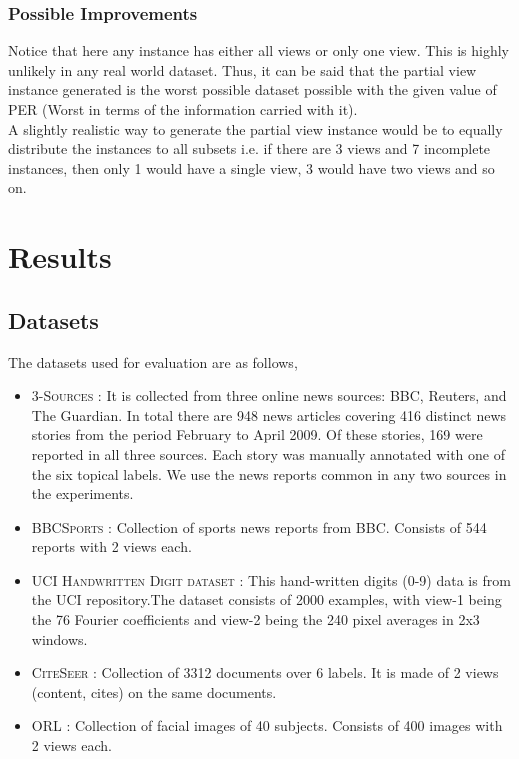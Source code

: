 \documentclass[a4paper]{article}
\begin{document}
	\subsubsection{Possible Improvements}
	
	Notice that here any instance has either all views or only one view. This is highly unlikely in any real world dataset. Thus, it can be said that the partial view instance generated is the worst possible dataset possible with the given value of PER (Worst in terms of the information carried with it).\\
	A slightly realistic way to generate the partial view instance would be to equally distribute the instances to all subsets i.e. if there are 3 views and 7 incomplete instances, then only 1 would have a single view, 3 would have two views and so on.
	
	\section{Results}

	\subsection{Datasets}
	
	The datasets used for evaluation are as follows,
	\begin{itemize}
	\item \textsc{3-Sources} : It is collected from three online news sources: BBC, Reuters, and The Guardian. In total there are 948 news articles covering 416 distinct news stories from the period February to April 2009. Of these stories, 169 were reported in all three sources. Each story was manually annotated with one of the six topical labels. We use the news reports common in any two sources in the experiments.
	\item \textsc{BBCSports} : Collection of sports news reports from BBC. Consists of 544 reports with 2 views each.
	\item \textsc{UCI Handwritten Digit dataset} : This hand-written digits (0-9) data is from the UCI repository.The dataset consists of 2000 examples, with view-1 being the 76 Fourier coefficients and view-2 being the 240 pixel averages in 2x3 windows.	
	\item \textsc{CiteSeer} : Collection of 3312 documents over 6 labels. It is made of 2 views (content, cites) on the same documents.
	\item \textsc{ORL} : Collection of facial images of 40 subjects. Consists of 400 images with 2 views each.	
	\end{itemize}
\end{document}
